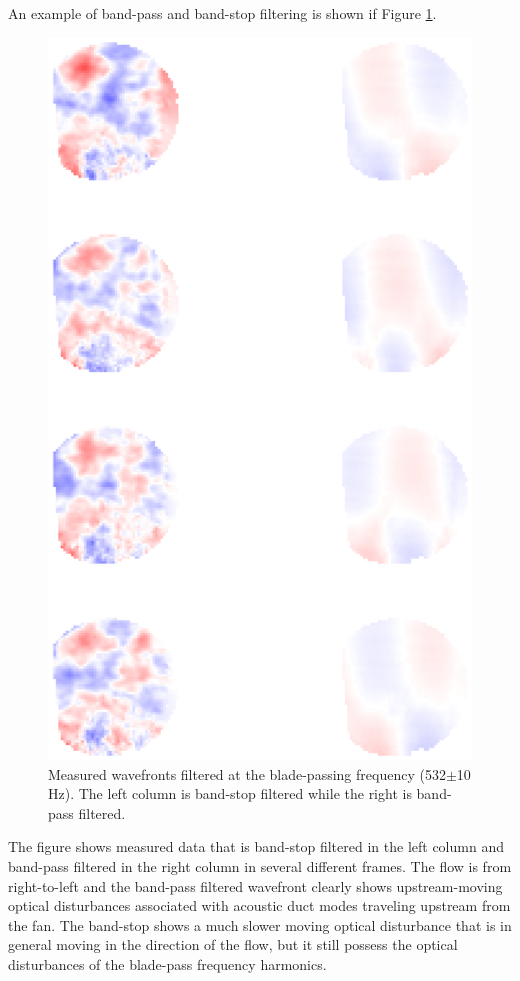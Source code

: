 An example of band-pass and band-stop filtering is shown if Figure \ref{fig:04_filter_temporal_bandpass}.
\begin{figure}
 \centering
 \includegraphics{../matlab/04_basic_filtering/filter_temporal_bandpass.eps}
 \caption{Measured wavefronts filtered at the blade-passing frequency (532$\pm$10 Hz).  The left column is band-stop filtered while the right is band-pass filtered.}
 \label{fig:04_filter_temporal_bandpass}
\end{figure}
The figure shows measured data that is band-stop filtered in the left column and band-pass filtered in the right column in several different frames.
The flow is from right-to-left and the band-pass filtered wavefront clearly shows upstream-moving optical disturbances associated with acoustic duct modes traveling upstream from the fan.
The band-stop shows a much slower moving optical disturbance that is in general moving in the direction of the flow, but it still possess the optical disturbances of the blade-pass frequency harmonics.

